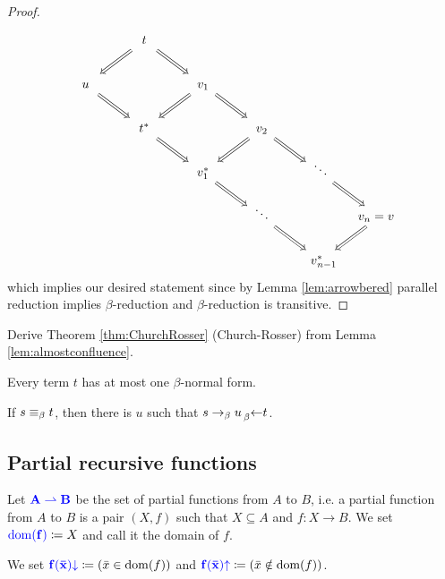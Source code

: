 \begin{proof}
\begin{equation*}
\begin{tikzcd}[/tikz/cells={/tikz/nodes={shape=asymmetrical
            rectangle,text width=0.5cm,text height=2ex,text depth=0.3ex,align=center}}]
            & t \ar[dl, Rightarrow] \ar[dr, Rightarrow] & \\
            u \ar[dr, Rightarrow] && v_1 \ar[dr, Rightarrow] \ar[dl, Rightarrow] \\
            & t^* \ar[dr, Rightarrow] && v_2 \ar[dr, Rightarrow] \ar[dl, Rightarrow] \\
            && v_1^* \ar[dr, Rightarrow] && \ddots \ar[dr, Rightarrow] \\
            &&& \ddots \ar[dr, Rightarrow] && \mathllap{v_n} = \mathrlap{v} \ar[dl, Rightarrow]\\
            &&&&\mathllap{v}_{n\mathrlap{-1}}^*
        \end{tikzcd}
    \end{equation*}
    which implies our desired statement since by Lemma \ref{lem:arrowbered} parallel reduction implies $\beta$-reduction and $\beta$-reduction is transitive.
\end{proof}

\begin{exercise}
    Derive Theorem \ref{thm:ChurchRosser} (Church-Rosser) from Lemma \ref{lem:almostconfluence}.
\end{exercise}

\begin{boxcor}
    Every term $t$ has at most one $\beta$-normal form.
\end{boxcor}

\begin{boxcor}
    If $s \equiv_{\beta} t$, then there is $u$ such that $s \to_{\beta} u \prescript{}{\beta}{\leftarrow} t$.
\end{boxcor}

\subsection{Partial recursive functions}

\begin{boxdefi}
    Let $\alert{A \rightharpoonup B}$ be the set of \alert{partial functions} from $A$ to $B$, i.e. a partial function from $A$ to $B$ is a pair $(X, f)$ such that $X \subseteq A$ and $f \colon X \to B$.
    We set $\alert{\domain{f}} \coloneq X$ and call it the \alert{domain} of $f$.
\end{boxdefi}

\begin{notation}
    We set $\alert{f(\vect{x})\down} \coloneq (\vect{x} \in \domain{f})$ and $\alert{f(\vect{x})\up} \coloneq (\vect{x} \notin \domain{f})$.
\end{notation}

